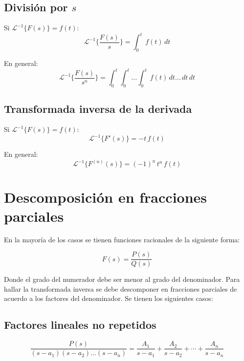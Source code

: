 \subsection{División por $s$}
Si $\mathcal{L}^{-1}\{F(s)\}=f(t)$:
\begin{equation}
    \mathcal{L}^{-1}\biggl\{\frac{F(s)}{s}\biggl\}=\int_0^t\,f(t)\,dt
\end{equation}

En general:
\begin{equation}
    \mathcal{L}^{-1}\biggl\{\frac{F(s)}{s^n}\biggl\}
        =\int_0^t\int_0^t\dots\int_0^t\,f(t)\,dt\dots\,dt\,dt
\end{equation}

\subsection{Transformada inversa de la derivada}
Si $\mathcal{L}^{-1}\{F(s)\}=f(t)$:
\begin{equation}
    \mathcal{L}^{-1}\{F'(s)\}=-t\,f(t)
\end{equation}

En general:
\begin{equation}
    \mathcal{L}^{-1}\{F^{(n)}(s)\}={(-1)}^n\,t^n\,f(t)
\end{equation}

\section{Descomposición en fracciones parciales}
En la mayoría de los casos se tienen funciones racionales de la siguiente forma:

\begin{equation*}
    F(s)=\frac{P(s)}{Q(s)}
\end{equation*}

Donde el grado del numerador debe ser menor al grado del denominador. Para
hallar la transformada inversa se debe descomponer en fracciones parciales de
acuerdo a los factores del denominador. Se tienen los siguientes casos:

\subsection{Factores lineales no repetidos}
\begin{equation*}
    \frac{P(s)}{(s-a_1)(s-a_2)\dots(s-a_n)}
        =\frac{A_1}{s-a_1}+\frac{A_2}{s-a_2}+\cdots+\frac{A_n}{s-a_n}
\end{equation*}

